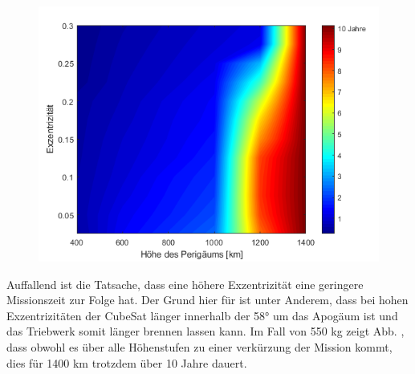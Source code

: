 \begin{figure}[h!]
	\centering
		\includegraphics[width=1.00\textwidth]{./graphics/GMAT/ecc_perigee_550kg.png}
	\label{fig:GMAT_ecc_550}
\end{figure}


Auffallend ist die Tatsache, dass eine höhere Exzentrizität eine geringere Missionszeit zur Folge hat. Der Grund hier für ist unter Anderem, dass bei hohen Exzentrizitäten der CubeSat länger innerhalb der 58° um das Apogäum ist und das Triebwerk somit länger brennen lassen kann. Im Fall von 550 kg zeigt Abb. , dass obwohl es über alle Höhenstufen zu einer verkürzung der Mission kommt, dies für 1400 km trotzdem über 10 Jahre dauert.



